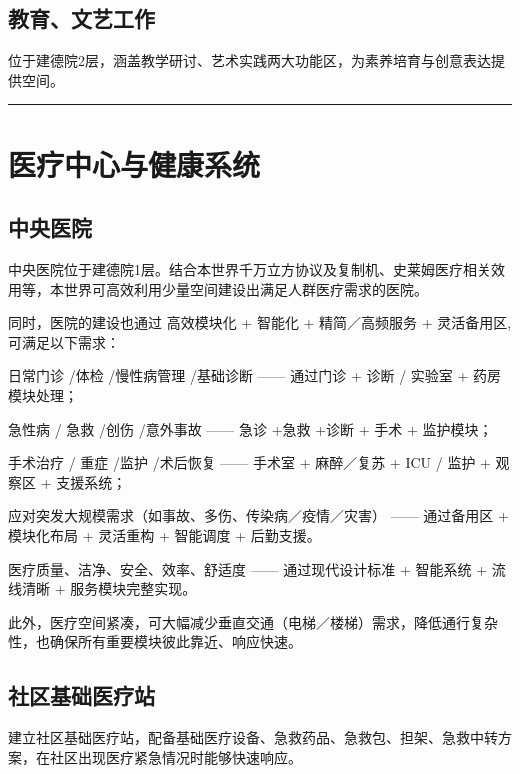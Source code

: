 \subsection{教育、文艺工作}\label{ux6559ux80b2ux6587ux827aux5de5ux4f5c}

位于建德院2层，涵盖教学研讨、艺术实践两大功能区，为素养培育与创意表达提供空间。

\begin{center}\rule{0.5\linewidth}{0.5pt}\end{center}

\section{医疗中心与健康系统}\label{ux533bux7597ux4e2dux5fc3ux4e0eux5065ux5eb7ux7cfbux7edf}

\subsection{中央医院}\label{ux4e2dux592eux533bux9662}

中央医院位于建德院1层。结合本世界千万立方协议及复制机、史莱姆医疗相关效用等，本世界可高效利用少量空间建设出满足人群医疗需求的医院。

同时，医院的建设也通过 高效模块化 + 智能化 + 精简／高频服务 + 灵活备用区,可满足以下需求：

日常门诊 /体检 /慢性病管理 /基础诊断 ------ 通过门诊 + 诊断 / 实验室 + 药房模块处理；

急性病 / 急救 /创伤 /意外事故 ------ 急诊 +急救 +诊断 + 手术 + 监护模块；

手术治疗 / 重症 /监护 /术后恢复 ------ 手术室 + 麻醉／复苏 + ICU / 监护 + 观察区 + 支援系统；

应对突发大规模需求（如事故、多伤、传染病／疫情／灾害） ------ 通过备用区 + 模块化布局 + 灵活重构 + 智能调度 + 后勤支援。

医疗质量、洁净、安全、效率、舒适度 ------ 通过现代设计标准 + 智能系统 + 流线清晰 + 服务模块完整实现。

此外，医疗空间紧凑，可大幅减少垂直交通（电梯／楼梯）需求，降低通行复杂性，也确保所有重要模块彼此靠近、响应快速。

\subsection{社区基础医疗站}\label{ux793eux533aux57faux7840ux533bux7597ux7ad9}

建立社区基础医疗站，配备基础医疗设备、急救药品、急救包、担架、急救中转方案，在社区出现医疗紧急情况时能够快速响应。

